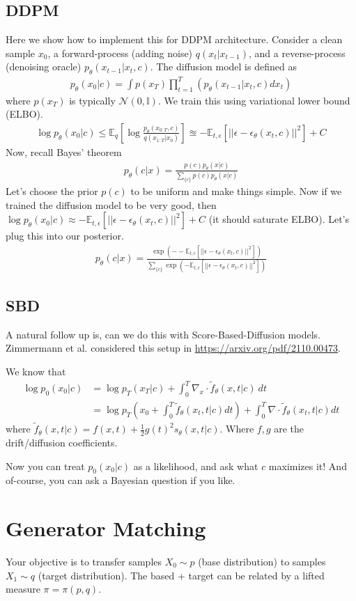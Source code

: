 \documentclass[12pt,fleqn]{article}
\numberwithin{equation}{section} %
\begin{document}
\subsection{DDPM}
Here we show how to implement this for DDPM architecture. Consider a clean sample $x_0$, a forward-process (adding noise) $q(x_t | x_{t-1})$, and a reverse-process (denoising oracle) $p_\theta(x_{t-1} | x_t , c)$. The diffusion model is defined as
\begin{align}
	p_\theta(x_0 | c) = \int p(x_T) \prod_{t=1}^T \left( p_\theta(x_{t-1} | x_t, c) dx_{t} \right)
\end{align} 
where $p(x_T)$ is typically $\mathcal N(0,\mathbb I)$. We train this using variational lower bound (ELBO). 
\begin{align}
	\log p_\theta(x_0 | c) \leq \mathbb E_q \left[ \log \frac{p_\theta(x_{0:T}, c)}{q(x_{1:T } | x_0)} \right] \approxeq  - \mathbb E_{t, \epsilon} [ || \epsilon - \epsilon_\theta(x_t, c)||^2]+ C
\end{align}
Now, recall Bayes' theorem
\begin{align}
	p_\theta(c | x) = \frac{p(c) p_\theta(x | c)}{\sum_{\{c\}} p(c) p_\theta(x |c)}
\end{align}
Let's choose the prior $p(c)$ to be uniform and make things simple. Now if we trained the diffusion model to be very good, then $\log p_\theta(x_0 | c) \approx - \mathbb E_{t, \epsilon}[||\epsilon - \epsilon_\theta(x_t, c)||^2] + C$ (it should saturate ELBO). Let's plug this into our posterior.
\begin{align}
	p_\theta(c|x) = \frac{\exp(- - \mathbb E_{t, \epsilon}[||\epsilon - \epsilon_\theta(x_t, c)||^2])}{\sum_{\{c\}} \exp(- \mathbb E_{t, \epsilon}[||\epsilon - \epsilon_\theta(x_t, c)||^2])}
\end{align}

\subsection{SBD}
A natural follow up is, can we do this with Score-Based-Diffusion models. Zimmermann et al. considered this setup in \url{https://arxiv.org/pdf/2110.00473}. 

We know that
\begin{align}
	\log p_0(x_0 | c) & = \log p_T(x_T | c)  + \int_0^T \nabla_x \cdot \tilde f_\theta(x,t |c) ~dt\\
	& = \log p_T \left(x_0 + \int_0^T \tilde f_\theta(x_t, t | c) dt \right)  + \int_0^T \nabla \cdot \tilde f_\theta(x_t, t | c) dt
\end{align}
where $\tilde f_\theta(x,t | c) = f(x,t) + \frac{1}{2} g(t)^2 s_\theta(x,t| c)$. Where $f,g$ are the drift/diffusion coefficients.

Now you can treat $p_0(x_0 | c)$ as a likelihood, and ask what $c$ maximizes it! And of-course, you can ask a Bayesian question if you like.

\section{Generator Matching}
Your objective is to transfer samples $X_0 \sim p$ (base distribution) to samples $X_1 \sim q$ (target distribution). The based + target can be related by a lifted measure $\pi = \pi(p,q)$.
\end{document}
